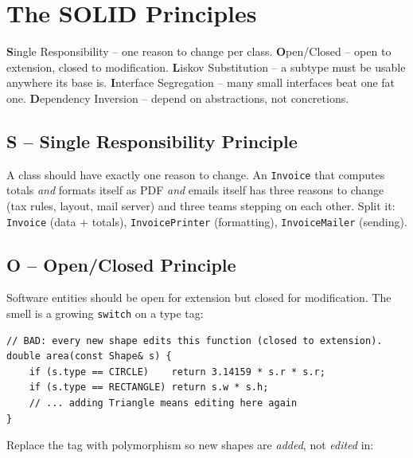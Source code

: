 \section{The SOLID Principles}
\label{sec:lld-solid}


\begin{patternbox}
\textbf{S}ingle Responsibility -- one reason to change per class.
\textbf{O}pen/Closed -- open to extension, closed to modification.
\textbf{L}iskov Substitution -- a subtype must be usable anywhere its base
is. \textbf{I}nterface Segregation -- many small interfaces beat one fat
one. \textbf{D}ependency Inversion -- depend on abstractions, not
concretions.
\end{patternbox}

\subsection*{S -- Single Responsibility Principle}

A class should have exactly one reason to change. An \texttt{Invoice} that
computes totals \emph{and} formats itself as PDF \emph{and} emails itself
has three reasons to change (tax rules, layout, mail server) and three
teams stepping on each other. Split it: \texttt{Invoice} (data + totals),
\texttt{InvoicePrinter} (formatting), \texttt{InvoiceMailer} (sending).

\subsection*{O -- Open/Closed Principle}

Software entities should be open for extension but closed for
modification. The smell is a growing \texttt{switch} on a type tag:

\begin{lstlisting}
// BAD: every new shape edits this function (closed to extension).
double area(const Shape& s) {
    if (s.type == CIRCLE)    return 3.14159 * s.r * s.r;
    if (s.type == RECTANGLE) return s.w * s.h;
    // ... adding Triangle means editing here again
}
\end{lstlisting}

Replace the tag with polymorphism so new shapes are \emph{added}, not
\emph{edited} in:

